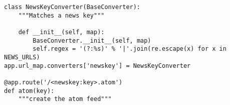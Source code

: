 \begin{lstlisting}[caption=HSKAtom - Routing,label=lst:hskatom-route-atom]
class NewsKeyConverter(BaseConverter):
    """Matches a news key"""

    def __init__(self, map):
        BaseConverter.__init__(self, map)
        self.regex = '(?:%s)' % '|'.join(re.escape(x) for x in NEWS_URLS)
app.url_map.converters['newskey'] = NewsKeyConverter

@app.route('/<newskey:key>.atom')
def atom(key):
    """create the atom feed"""
\end{lstlisting}
